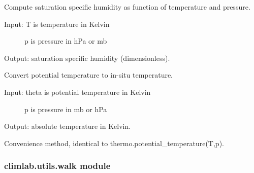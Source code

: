 \documentclass[letterpaper,10pt,english]{sphinxmanual}
\begin{document}

\begin{fulllineitems}
\label{api/climlab.utils:climlab.utils.thermo.qsat}
Compute saturation specific humidity as function of temperature and pressure.
\begin{description}
\item[{Input:  T is temperature in Kelvin}] \leavevmode
p is pressure in hPa or mb

\end{description}

Output: saturation specific humidity (dimensionless).

\end{fulllineitems}


\begin{fulllineitems}
\label{api/climlab.utils:climlab.utils.thermo.temperature_from_potential}
Convert potential temperature to in-situ temperature.
\begin{description}
\item[{Input:  theta is potential temperature in Kelvin}] \leavevmode
p is pressure in mb or hPa

\end{description}

Output: absolute temperature in Kelvin.

\end{fulllineitems}


\begin{fulllineitems}
\label{api/climlab.utils:climlab.utils.thermo.theta}
Convenience method, identical to thermo.potential\_temperature(T,p).

\end{fulllineitems}



\subsubsection{climlab.utils.walk module}
\label{api/climlab.utils:module-climlab.utils.walk}\label{api/climlab.utils:climlab-utils-walk-module}
\end{document}
